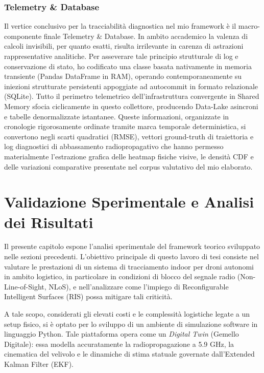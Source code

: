 \documentclass[twoside]{article}
\begin{document}
\subsubsection{Telemetry \& Database}

Il vertice conclusivo per la tracciabilità diagnostica nel mio framework è il macro-componente finale Telemetry \& Database. In ambito accademico la valenza di calcoli invisibili, per quanto esatti, risulta irrilevante in carenza di astrazioni rappresentative analitiche. Per asseverare tale principio strutturale di log e conservazione di stato, ho codificato una classe basata nativamente in memoria transiente (Pandas DataFrame in RAM), operando contemporaneamente su iniezioni strutturate persistenti appoggiate ad autocommit in formato relazionale (SQLite). Tutto il perimetro telemetrico dell'infrastruttura convergente in Shared Memory sfocia ciclicamente in questo collettore, producendo Data-Lake asincroni e tabelle denormalizzate istantanee. Queste informazioni, organizzate in cronologie rigorosamente ordinate tramite marca temporale deterministica, si convertono negli scarti quadratici (RMSE), vettori ground-truth di traiettoria e log diagnostici di abbassamento radiopropagativo che hanno permesso materialmente l'estrazione grafica delle heatmap fisiche visive, le densità CDF e delle variazioni comparative presentate nel corpus valutativo del mio elaborato.

\clearpage
\section{Validazione Sperimentale e Analisi dei Risultati}

Il presente capitolo espone l'analisi sperimentale del framework teorico sviluppato nelle sezioni precedenti. L'obiettivo principale di questo lavoro di tesi consiste nel valutare le prestazioni di un sistema di tracciamento indoor per droni autonomi in ambito logistico, in particolare in condizioni di blocco del segnale radio (Non-Line-of-Sight, NLoS), e nell'analizzare come l'impiego di Reconfigurable Intelligent Surfaces (RIS) possa mitigare tali criticità.

A tale scopo, considerati gli elevati costi e le complessità logistiche legate a un setup fisico, si è optato per lo sviluppo di un ambiente di simulazione software in linguaggio Python. Tale piattaforma opera come un \textit{Digital Twin} (Gemello Digitale): essa modella accuratamente la radiopropagazione a 5.9 GHz, la cinematica del velivolo e le dinamiche di stima statuale governate dall'Extended Kalman Filter (EKF).
\end{document}
